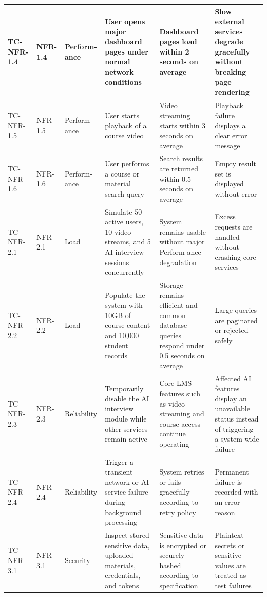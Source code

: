 \begin{longtable}{|>{\centering\arraybackslash}m{}|>{\centering\arraybackslash}m{}|>{\centering\arraybackslash}m{}|m{}|m{}|m{}|}
TC-NFR-1.4 & NFR-1.4 & Perform-ance &
User opens major dashboard pages under normal
network conditions &
Dashboard pages load within 2 seconds on average &
Slow external services degrade gracefully without
breaking page rendering \\ \hline

TC-NFR-1.5 & NFR-1.5 & Perform-ance &
User starts playback of a course video &
Video streaming starts within 3 seconds on average &
Playback failure displays a clear error message \\ \hline

TC-NFR-1.6 & NFR-1.6 & Perform-ance &
User performs a course or material search query &
Search results are returned within 0.5 seconds on average &
Empty result set is displayed without error \\ \hline

TC-NFR-2.1 & NFR-2.1 & Load &
Simulate 50 active users, 10 video streams, and
5 AI interview sessions concurrently &
System remains usable without major Perform-ance
degradation &
Excess requests are handled without crashing
core services \\ \hline

TC-NFR-2.2 & NFR-2.2 & Load &
Populate the system with 10GB of course content
and 10,000 student records &
Storage remains efficient and common database queries
respond under 0.5 seconds on average &
Large queries are paginated or rejected safely \\ \hline

TC-NFR-2.3 & NFR-2.3 & Reliability &
Temporarily disable the AI interview module while
other services remain active &
Core LMS features such as video streaming and course
access continue operating &
Affected AI features display an unavailable status
instead of triggering a system-wide failure \\ \hline

TC-NFR-2.4 & NFR-2.4 & Reliability &
Trigger a transient network or AI service failure
during background processing &
System retries or fails gracefully according to
retry policy &
Permanent failure is recorded with an error reason \\ \hline

TC-NFR-3.1 & NFR-3.1 & Security &
Inspect stored sensitive data, uploaded materials,
credentials, and tokens &
Sensitive data is encrypted or securely hashed
according to specification &
Plaintext secrets or sensitive values are treated
as test failures \\ \hline


\end{longtable}
